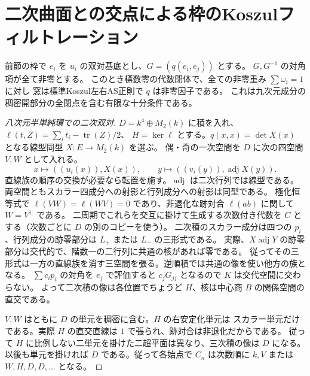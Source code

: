 \section{二次曲面との交点による枠のKoszulフィルトレーション}
\label{sec:half-period-semisimple}
\begin{theorem}\label{thm:half-period-semisimple}
前節の枠で $e_i$ を $u_i$ の双対基底とし、$G=(q(e_i,e_j))$ とする。
$G,G^{-1}$ の対角項が全て非零とする。
このとき標数零の代数閉体で、全ての非零重み $\sum\omega_i=1$ に対し
窓は標準Koszul左右AS正則で $q$ は非零因子である。
これは九次元成分の稠密開部分の全閉点を含む有限な十分条件である。
\end{theorem}
\begin{proof}[八次元半単純環での二次双対]
$D=k^4\oplus M_2(k)$ に積を入れ、$\ell(t,Z)=\sum_i t_i-\operatorname{tr}(Z)/2$、
$H=\ker\ell$ とする。$q(x,x)=\det X(x)$ となる線型同型 $X:E\to M_2(k)$ を選ぶ。
偶・奇の一次空間を $D$ に次の四空間 $V,W$ として入れる。
\[
 x\mapsto ((u_i(x)),X(x)),\qquad y\mapsto ((v_i(y)),\operatorname{adj}X(y)).
\]
直線族の順序の交換が必要なら転置を施す。$\operatorname{adj}$ は二次行列では線型である。
両空間ともスカラー四成分への射影と行列成分への射影は同型である。
極化恒等式で $\ell(VW)=\ell(WV)=0$ であり、非退化な跡対合 $\ell(ab)$ に関して $W=V^\perp$ である。
二周期でこれらを交互に掛けて生成する次数付き代数を $C$ とする（次数ごとに $D$ の別のコピーを使う）。
二次積のスカラー成分は四つの $p_i$、行列成分の跡零部分は $L_+$ または $L_-$ の三形式である。
実際、$X\operatorname{adj}Y$ の跡零部分は交代的で、階数一の二行列に共通の核があれば零である。
従ってその三形式は一方の直線族を消す三空間を張る。逆順積では共通の像を使い他方の族となる。
$\sum c_i p_i$ の対角を $e_j$ で評価すると $c_jG_{jj}$ となるので $K$ は交代空間に交わらない。
よって二次積の像は各位置でちょうど $H$、核は中心商 $B$ の関係空間の直交である。

$V,W$ はともに $D$ の単元を稠密に含む。$H$ の右安定化単元は
スカラー単元だけである。実際 $H$ の直交直線は $1$ で張られ、跡対合は非退化だからである。
従って $H$ に比例しない二単元を掛けた二超平面は異なり、三次積の像は $D$ になる。
以後も単元を掛ければ $D$ である。従って各始点で $C_n$ は次数順に $k,V$ または $W,H,D,D,\ldots$ となる。
\end{proof}

